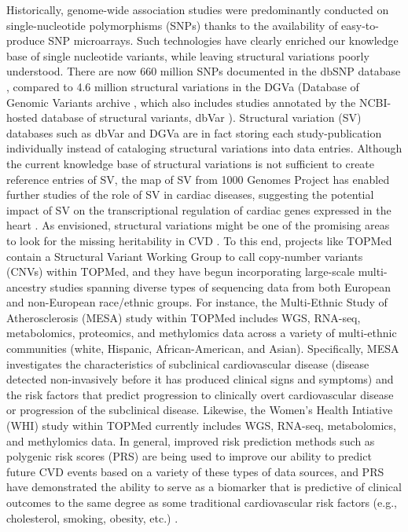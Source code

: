 \documentclass[letter]{bioinfo}
\begin{document}
	Historically, genome-wide association studies were predominantly conducted on single-nucleotide polymorphisms (SNPs) thanks to the availability of easy-to-produce SNP microarrays. Such technologies have clearly enriched our knowledge base of single nucleotide variants, while leaving structural variations poorly understood. There are now 660 million SNPs documented in the dbSNP database \citep{NCBI:2018:dbSNP}, compared to 4.6 million structural variations in the DGVa (Database of Genomic Variants archive \citep{EMBL-EBI:2018:Database}, which also includes studies annotated by the NCBI-hosted database of structural variants, dbVar \citep{NCBI:2018:dbVar}).  Structural variation (SV) databases such as dbVar and DGVa are in fact storing each study-publication individually instead of cataloging structural variations into data entries. Although the current knowledge base of structural variations is not sufficient to create reference entries of SV, the map of SV from 1000 Genomes Project \citep{Sudmant:2015:integrated} has enabled further studies of the role of SV in cardiac diseases, suggesting the potential impact of SV on the transcriptional regulation of cardiac genes expressed in the heart \citep{Haas:2018:Genomic}. As envisioned, structural variations might be one of the promising areas to look for the missing heritability in CVD \citep{Eichler:2010:Missing}.  To this end, projects like TOPMed contain a Structural Variant Working Group to call copy-number variants (CNVs) within TOPMed, and they have begun incorporating large-scale multi-ancestry studies spanning diverse types of sequencing data from both European and non-European race/ethnic groups.  For instance, the Multi-Ethnic Study of Atherosclerosis (MESA) study \citep{Bild:2002:MultiEthnic} within TOPMed includes WGS, RNA-seq, metabolomics, proteomics, and methylomics data across a variety of multi-ethnic communities (white, Hispanic, African-American, and Asian).  Specifically, MESA investigates the characteristics of subclinical cardiovascular disease (disease detected non-invasively before it has produced clinical signs and symptoms) and the risk factors that predict progression to clinically overt cardiovascular disease or progression of the subclinical disease.  Likewise, the Women's Health Intiative (WHI) study \citep{NHLBI:1991:Women} within TOPMed currently includes WGS, RNA-seq, metabolomics, and methylomics data.  In general, improved risk prediction methods such as polygenic risk scores (PRS) are being used to improve our ability to predict future CVD events \citep{Goldstein:2014:Simple} based on a variety of these types of data sources, and PRS have demonstrated the ability to serve as a biomarker that is predictive of clinical outcomes to the same degree as some traditional cardiovascular risk factors (e.g., cholesterol, smoking, obesity, etc.) \citep{deVries:2015:Incremental}. 
	
\end{document}
